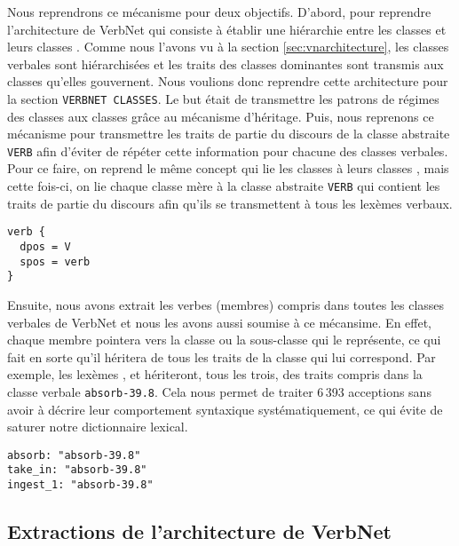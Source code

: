 Nous reprendrons ce mécanisme pour deux objectifs. D'abord, pour reprendre l'architecture de VerbNet qui consiste à établir une hiérarchie entre les classes  et leurs classes . Comme nous l'avons vu à la section \ref{sec:vnarchitecture}, les classes verbales sont hiérarchisées et les traits des classes dominantes sont transmis aux classes qu'elles gouvernent. Nous voulions donc reprendre cette architecture pour la section \texttt{VERBNET CLASSES}. Le but était de transmettre les patrons de régimes des classes  aux classes  grâce au mécanisme d'héritage. Puis, nous reprenons ce mécanisme pour transmettre les traits de partie du discours de la classe abstraite \texttt{VERB} afin d'éviter de répéter cette information pour chacune des classes verbales. Pour ce faire, on reprend le même concept qui lie les classes  à leurs classes , mais cette fois-ci, on lie chaque classe mère à la classe abstraite \texttt{VERB} qui contient les traits de partie du discours afin qu'ils se transmettent à tous les lexèmes verbaux.

\begin{lstlisting}[language=mate, caption=Traits de la classe abstraite \texttt{VERB}]
verb {
  dpos = V
  spos = verb
}
\end{lstlisting}

Ensuite, nous avons extrait les verbes (membres) compris dans toutes les classes verbales de VerbNet et nous les avons aussi soumise à ce mécansime. En effet, chaque membre pointera vers la classe ou la sous-classe qui le représente, ce qui fait en sorte qu'il héritera de tous les traits de la classe qui lui correspond. Par exemple, les lexèmes ,  et  hériteront, tous les trois, des traits compris dans la classe verbale \texttt{absorb-39.8}. Cela nous permet de traiter 6\,393 acceptions sans avoir à décrire leur comportement syntaxique systématiquement, ce qui évite de saturer notre dictionnaire lexical.

\begin{lstlisting}[language=mate, caption=Membres verbaux pointant vers leur classe correspondante]
absorb: "absorb-39.8"
take_in: "absorb-39.8"
ingest_1: "absorb-39.8"
\end{lstlisting}

\subsection{Extractions de l'architecture de VerbNet}

